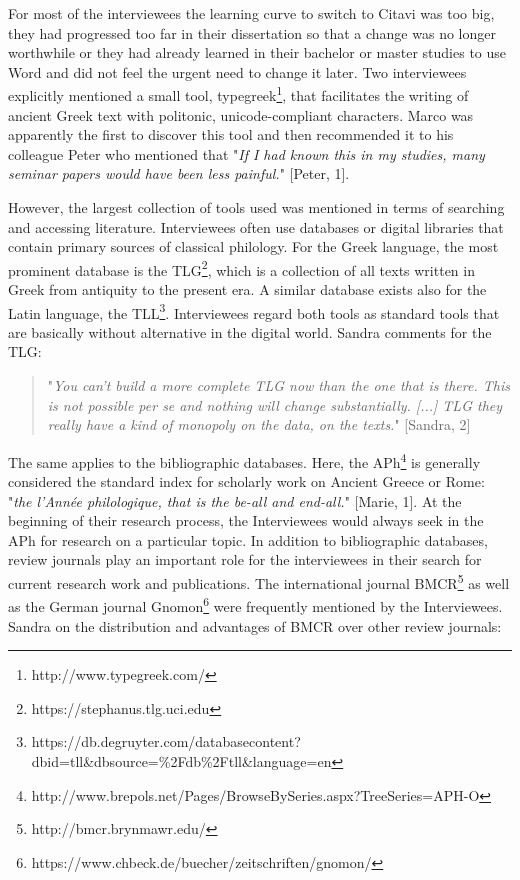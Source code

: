 \documentclass[12pt, a4paper, titlepage, oneside, abstract=true, toc=listof, toc=bibliography]{scrreprt}
\begin{document}
For most of the interviewees the learning curve to switch to Citavi was too big, they had progressed too far in their dissertation so that a change was no longer worthwhile or they had already learned in their bachelor or master studies to use Word and did not feel the urgent need to change it later. 
Two interviewees explicitly mentioned a small tool, typegreek\footnote{http://www.typegreek.com/}, that facilitates the writing of ancient Greek text with politonic, unicode-compliant characters. Marco was apparently the first to discover this tool and then recommended it to his colleague Peter who mentioned that "\textit{If I had known this in my studies, many seminar papers would have been less painful.}" [Peter, 1].

However, the largest collection of tools used was mentioned in terms of searching and accessing literature. Interviewees often use databases or digital libraries that contain primary sources of classical philology. 
For the Greek language, the most prominent database is the \gls{TLG}\footnote{https://stephanus.tlg.uci.edu}, which is a collection of all texts written in Greek from antiquity to the present era. A similar database exists also for the Latin language, the \gls{TLL}\footnote{https://db.degruyter.com/databasecontent?dbid=tll\&dbsource=\%2Fdb\%2Ftll\&language=en}.  Interviewees regard both tools as standard tools that are basically without alternative in the digital world. Sandra comments for the \gls{TLG}: 

\begin{quotation}
"\textit{You can't build a more complete TLG now than the one that is there. This is not possible per se and nothing will change substantially. [...] TLG they really have a kind of monopoly on the data, on the texts.}" [Sandra, 2]
\end{quotation}

The same applies to the bibliographic databases. Here, the \gls{APh}\footnote{http://www.brepols.net/Pages/BrowseBySeries.aspx?TreeSeries=APH-O} is generally considered the standard index for scholarly work on Ancient Greece or Rome: "\textit{the l'Année philologique, that is the be-all and end-all.}" [Marie, 1]. At the beginning of their research process, the Interviewees would always seek in the APh for research on a particular topic. 
In addition to bibliographic databases, review journals play an important role for the interviewees in their search for current research work and publications. The international journal \gls{BMCR}\footnote{http://bmcr.brynmawr.edu/} as well as the German journal \gls{Gnomon}\footnote{https://www.chbeck.de/buecher/zeitschriften/gnomon/} were frequently mentioned by the Interviewees. Sandra on the distribution and advantages of BMCR over other review journals: 
\end{document}
